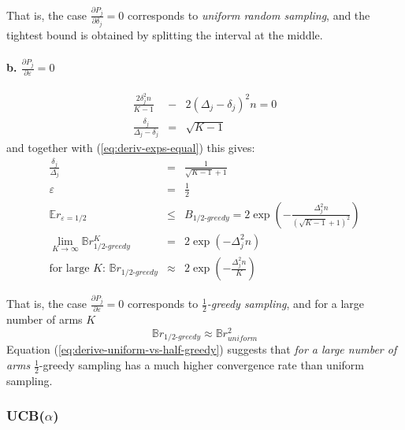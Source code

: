 \documentclass{article}
\newcommand {\IE} {\ensuremath {\mathbb{E}}}
\begin{document}
That is, the case $\frac {\partial P_j} {\partial \delta_j}=0$
corresponds to \emph{uniform random sampling}, and the tightest bound is obtained
by splitting the interval at the middle.


\paragraph{b. {\large $\frac {\partial P_j} {\partial \varepsilon}=0$}}

\begin{eqnarray*}
\frac {2\delta_j^2 n} {K-1}
  &-& 2(\Delta_j-\delta_j)^2n=0\\
\frac {\delta_j} {\Delta_j-\delta_j}&=&\sqrt {K-1}
\end{eqnarray*}
and together with (\ref{eq:deriv-exps-equal}) this gives:
\begin{eqnarray}
\frac {\delta_j} {\Delta_j}&=&\frac 1 {\sqrt {K-1}+1}\nonumber\\
\varepsilon&=&\frac 1 2\nonumber\\
\IE
r_{\varepsilon=1/2}&\le&B_{1/2\mbox{-}greedy}=2\exp\left(-\frac
  {\Delta_j^2n} {(\sqrt{K-1}+1)^2}\right)\nonumber\\
\lim_{K\to\infty}
\mathbb{B}r_{1/2\mbox{-}greedy}^K&=&2\exp\left(-{\Delta_j^2n}\right)\nonumber\\
\mbox{for large $K$: }\mathbb{B}r_{1/2\mbox{-}greedy}&\approx&2\exp\left(-\frac {\Delta_j^2n} K\right)
\label{eq:deriv-half-greedy-sampling}
\end{eqnarray}

That is, the case $\frac {\partial P_j} {\partial \varepsilon}=0$
corresponds to \emph{$\frac 1 2$-greedy sampling}, and for a large number of
arms $K$ 
\begin{equation}
\mathbb{B}r_{1/2\mbox{-}greedy}\approx \mathbb{B}r_{uniform}^2
\label{eq:derive-uniform-vs-half-greedy}
\end{equation}
Equation (\ref{eq:derive-uniform-vs-half-greedy}) suggests
that \emph{for a large number of arms} $\frac 1 2$-greedy
sampling has a much higher convergence rate than uniform
sampling.

\subsubsection{UCB($\alpha$)}
\label{app:derivations-asym-ucb}
\end{document}
